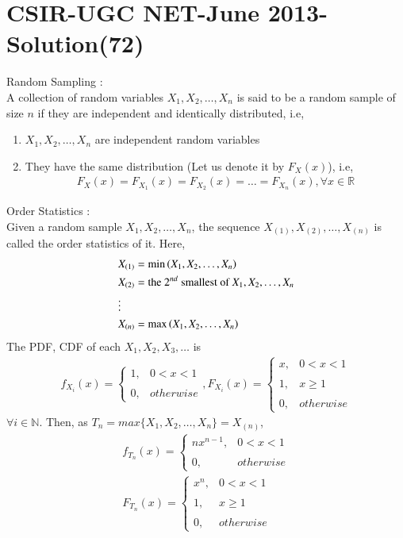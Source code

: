\documentclass[journal,12pt,twocolumn]{IEEEtran}
\begin{document}
\section*{CSIR-UGC NET-June 2013-Solution(72)}
Random Sampling :\\
A collection of random variables $X_{1},X_{2},\dots,X_{n}$ is said to be a random sample of size $n$ if they are independent and identically distributed, i.e,
\begin{enumerate}
    \item $X_{1},X_{2},\dots,X_{n}$ are independent random variables
    \item They have the same distribution (Let us denote it by $F_{X}(x)$), i.e,
    \begin{align}
        F_{X}(x)=F_{X_{1}}(x)=F_{X_{2}}(x)=\dots=F_{X_{n}}(x),\forall x\in \mathbb{R}
    \end{align}
\end{enumerate}
Order Statistics :\\
Given a random sample $X_{1},X_{2},\dots,X_{n}$, the sequence $X_{(1)},X_{(2)},\dots,X_{(n)}$ is called the order statistics of it. Here,
\begin{align}
    &X_{(1)}=\min\left(X_{1},X_{2},\dots,X_{n}\right)\\
    &X_{(2)}=\text{the }2^{nd}\text{ smallest of }X_{1},X_{2},\dots,X_{n}\\
    &\vdots\\
    &X_{(n)}=\max\left(X_{1},X_{2},\dots,X_{n}\right)
\end{align}
The PDF, CDF of each $X_{1},X_{2},X_{3},\dots$ is 
\begin{align}
    f_{X_{i}}(x)=\begin{cases}
	1, & 0< x<1 \\~\\[-1em]
	0, & otherwise
	\end{cases},
	F_{X_{i}}(x)=\begin{cases}
	x, & 0< x<1 \\~\\[-1em]
	1, & x\geq 1\\~\\[-1em]
	0, & otherwise
	\end{cases} 
\end{align}
$\forall i\in \mathbb{N}$.
Then, as $T_{n}=max\{ X_{1},X_{2},\dots,X_{n}\}=X_{(n)}$,
\begin{align}
    f_{T_{n}}(x)=\begin{cases}
	nx^{n-1}, & 0< x<1 \\~\\[-1em]
	0, & otherwise
	\end{cases}\\
	F_{T_{n}}(x)=\begin{cases}
	x^{n}, & 0< x<1 \\~\\[-1em]
	1, & x\geq 1\\~\\[-1em]
	0, & otherwise
	\end{cases} 
\end{align}
\end{document}
